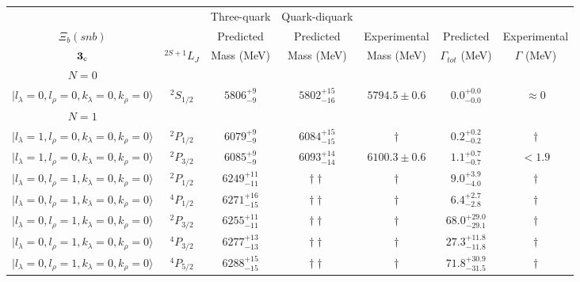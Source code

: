 \begin{tabular}{c c| c c c c c }\hline \hline
            &  & Three-quark &  Quark-diquark    &               &              &  \\ 
$\Xi_{b}(snb)$&  & Predicted   &    Predicted   &  Experimental &  Predicted            & Experimental \\ 
${\bf {3}}_{\rm c}$  & $^{2S+1}L_{J}$ & Mass (MeV)  &   Mass (MeV)   &  Mass (MeV)   &  $\Gamma_{tot}$ (MeV) & $\Gamma$ (MeV) \\ \hline
\hline
 $N=0$  &  &  &  &  &  \\ 
$\vert l_{\lambda}\!\!=\!0, l_{\rho}\!\!=\!0, k_{\lambda}\!\!=\!0, k_{\rho}\!\!=\!0 \rangle$ & $^{2}S_{1/2}$ & $5806^{+9}_{-9}$ & $5802^{+15}_{-16}$ & $5794.5\pm 0.6$ & $0.0^{+0.0}_{-0.0}$ & $\approx 0$ \\ 
\hline
 $N=1$  &  &  &  &  &  \\ 
$\vert l_{\lambda}\!\!=\!1, l_{\rho}\!\!=\!0, k_{\lambda}\!\!=\!0, k_{\rho}\!\!=\!0 \rangle$ & $^{2}P_{1/2}$ & $6079^{+9}_{-9}$ & $6084^{+15}_{-15}$ & $\dagger$ & $0.2^{+0.2}_{-0.2}$ & $\dagger$ \\ 
$\vert l_{\lambda}\!\!=\!1, l_{\rho}\!\!=\!0, k_{\lambda}\!\!=\!0, k_{\rho}\!\!=\!0 \rangle$ & $^{2}P_{3/2}$ & $6085^{+9}_{-9}$ & $6093^{+14}_{-14}$ & $6100.3\pm 0.6$ & $1.1^{+0.7}_{-0.7}$ & $<1.9$ \\ 
$\vert l_{\lambda}\!\!=\!0, l_{\rho}\!\!=\!1, k_{\lambda}\!\!=\!0, k_{\rho}\!\!=\!0 \rangle$ & $^{2}P_{1/2}$ & $6249^{+11}_{-11}$ & $\dagger\dagger$ & $\dagger$ & $9.0^{+3.9}_{-4.0}$ & $\dagger$ \\ 
$\vert l_{\lambda}\!\!=\!0, l_{\rho}\!\!=\!1, k_{\lambda}\!\!=\!0, k_{\rho}\!\!=\!0 \rangle$ & $^{4}P_{1/2}$ & $6271^{+16}_{-15}$ & $\dagger\dagger$ & $\dagger$ & $6.4^{+2.7}_{-2.8}$ & $\dagger$ \\ 
$\vert l_{\lambda}\!\!=\!0, l_{\rho}\!\!=\!1, k_{\lambda}\!\!=\!0, k_{\rho}\!\!=\!0 \rangle$ & $^{2}P_{3/2}$ & $6255^{+11}_{-11}$ & $\dagger\dagger$ & $\dagger$ & $68.0^{+29.0}_{-29.1}$ & $\dagger$ \\ 
$\vert l_{\lambda}\!\!=\!0, l_{\rho}\!\!=\!1, k_{\lambda}\!\!=\!0, k_{\rho}\!\!=\!0 \rangle$ & $^{4}P_{3/2}$ & $6277^{+13}_{-13}$ & $\dagger\dagger$ & $\dagger$ & $27.3^{+11.8}_{-11.8}$ & $\dagger$ \\ 
$\vert l_{\lambda}\!\!=\!0, l_{\rho}\!\!=\!1, k_{\lambda}\!\!=\!0, k_{\rho}\!\!=\!0 \rangle$ & $^{4}P_{5/2}$ & $6288^{+15}_{-15}$ & $\dagger\dagger$ & $\dagger$ & $71.8^{+30.9}_{-31.5}$ & $\dagger$ \\ 

\end{tabular}
